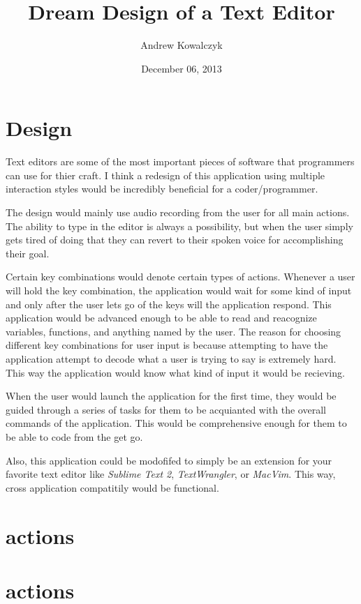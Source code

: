 \documentclass[11pt, oneside]{article}
\title{Dream Design of a Text Editor}
\author{Andrew Kowalczyk}
\date{December 06, 2013}
\begin{document}
\maketitle


\section{Design}
Text editors are some of the most important pieces of software that programmers can use for thier craft. I think a redesign of this application using multiple interaction styles would be incredibly beneficial for a coder/programmer.

The design would mainly use audio recording from the user for all main actions. The ability to type in the editor is always a possibility, but when the user simply gets tired of doing that they can revert to their spoken voice for accomplishing their goal.

Certain key combinations would denote certain types of actions. Whenever a user will hold the key combination, the application would wait for some kind of input and only after the user lets go of the keys will the application respond. This application would be advanced enough to be able to read and reacognize variables, functions, and anything named by the user. The reason for choosing different key combinations for user input is because attempting to have the application attempt to decode what a user is trying to say is extremely hard. This way the application would know what kind of input it would be recieving.

When the user would launch the application for the first time, they would be guided through a series of tasks for them to be acquianted with the overall commands of the application. This would be comprehensive enough for them to be able to code from the get go.

Also, this application could be modofifed to simply be an extension for your favorite text editor like \textit{Sublime Text 2}, \textit{TextWrangler}, or \textit{MacVim}. This way, cross application compatitily would be functional.

\section{ actions}

\section{ actions}
\end{document}
